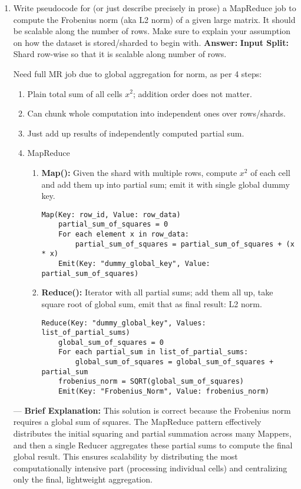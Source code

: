 \documentclass{article}
\begin{document}
\begin{enumerate}[label=\textbf{Question \arabic*.}]

\item Write pseudocode for (or just describe precisely in prose) a MapReduce job to compute the Frobenius norm (aka L2 norm) of a given large matrix. It should be scalable along the number of rows. Make sure to explain your assumption on how the dataset is stored/sharded to begin with.
  \textbf{Answer:}
  \textbf{Input Split:} Shard row-wise so that it is scalable along number of rows.

  Need full MR job due to global aggregation for norm, as per 4 steps:
    \begin{enumerate}[label=\arabic*.]
    \item Plain total sum of all cells $x^2$; addition order does not matter.
    \item Can chunk whole computation into independent ones over rows/shards.
    \item Just add up results of independently computed partial sum.
    \item MapReduce
      \begin{enumerate}[label=(\alph*)]
      \item \textbf{Map():} Given the shard with multiple rows, compute $x^2$ of each cell and add them up into partial sum; emit it with single global dummy key.
        \begin{lstlisting}
Map(Key: row_id, Value: row_data)
    partial_sum_of_squares = 0
    For each element x in row_data:
        partial_sum_of_squares = partial_sum_of_squares + (x * x)
    Emit(Key: "dummy_global_key", Value: partial_sum_of_squares)
        \end{lstlisting}
      \item \textbf{Reduce():} Iterator with all partial sums; add them all up, take square root of global sum, emit that as final result: L2 norm.
        \begin{lstlisting}
Reduce(Key: "dummy_global_key", Values: list_of_partial_sums)
    global_sum_of_squares = 0
    For each partial_sum in list_of_partial_sums:
        global_sum_of_squares = global_sum_of_squares + partial_sum
    frobenius_norm = SQRT(global_sum_of_squares)
    Emit(Key: "Frobenius_Norm", Value: frobenius_norm)
        \end{lstlisting}
      \end{enumerate}
    \end{enumerate}
    ---
    \textbf{Brief Explanation:} This solution is correct because the Frobenius norm requires a global sum of squares. The MapReduce pattern effectively distributes the initial squaring and partial summation across many Mappers, and then a single Reducer aggregates these partial sums to compute the final global result. This ensures scalability by distributing the most computationally intensive part (processing individual cells) and centralizing only the final, lightweight aggregation.


\end{enumerate}
\end{document}
